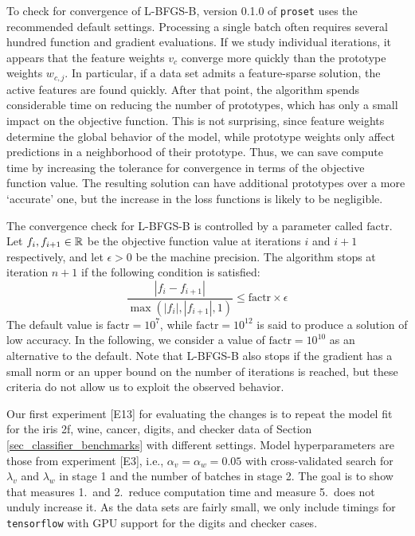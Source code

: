 %
To check for convergence of L-BFGS-B, version 0.1.0 of \texttt{proset} uses the recommended default settings.
Processing a single batch often requires several hundred function and gradient evaluations.
If we study individual iterations, it appears that the feature weights $v_c$ converge more quickly than the prototype weights $w_{c,j}$.
In particular, if a data set admits a feature-sparse solution, the active features are found quickly.
After that point, the algorithm spends considerable time on reducing the number of prototypes, which has only a small impact on the objective function.
This is not surprising, since feature weights determine the global behavior of the model, while prototype weights only affect predictions in a neighborhood of their prototype.
Thus, we can save compute time by increasing the tolerance for convergence in terms of the objective function value.
The resulting solution can have additional prototypes over a more `accurate' one, but the increase in the loss functions is likely to be negligible.\par
%
The convergence check for L-BFGS-B is controlled by a parameter called $\text{factr}$.
Let $f_i,f_{i+1}\in\mathbb{R}$ be the objective function value at iterations $i$ and $i+1$ respectively, and let $\epsilon>0$ be the machine precision.
The algorithm stops at iteration $n+1$ if the following condition is satisfied:
%
\begin{equation}
\frac{|f_{i}-f_{i+1}|}{\max(|f_{i}|,|f_{i+1}|,1)}\leq\text{factr}\times\epsilon\label{eq_l_bfgs_b_stop}
\end{equation}
%
The default value is $\text{factr}=10^7$, while $\text{factr}=10^{12}$ is said to produce a solution of low accuracy.
In the following, we consider a value of $\text{factr}=10^{10}$ as an alternative to the default.
Note that L-BFGS-B also stops if the gradient has a small norm or an upper bound on the number of iterations is reached, but these criteria do not allow us to exploit the observed behavior.\par
%
Our first experiment [E13] for evaluating the changes is to repeat the model fit for the iris 2f, wine, cancer, digits, and checker data of Section \ref{sec_classifier_benchmarks} with different settings.
Model hyperparameters are those from experiment [E3], i.e., $\alpha_v=\alpha_w=0.05$ with cross-validated search for $\lambda_v$ and $\lambda_w$ in stage 1 and the number of batches in stage 2.
The goal is to show that measures 1.\ and 2.\ reduce computation time and measure 5.\ does not unduly increase it.
As the data sets are fairly small, we only include timings for \texttt{tensorflow} with GPU support for the digits and checker cases.
